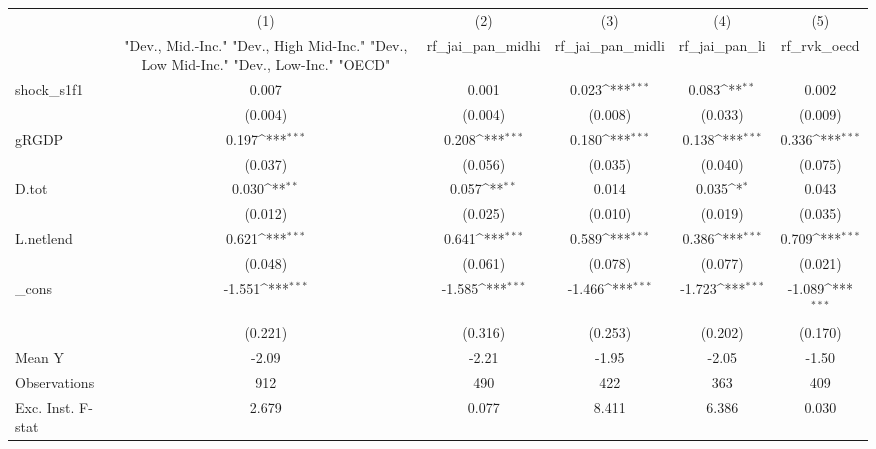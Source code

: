 {
\def\sym#1{\ifmmode^{#1}\else\(^{#1}\)\fi}
\begin{tabular}{l*{5}{c}}
\toprule
            &\multicolumn{1}{c}{(1)}&\multicolumn{1}{c}{(2)}&\multicolumn{1}{c}{(3)}&\multicolumn{1}{c}{(4)}&\multicolumn{1}{c}{(5)}\\
            &\multicolumn{1}{c}{ "Dev., Mid.-Inc." "Dev., High Mid-Inc." "Dev., Low Mid-Inc." "Dev., Low-Inc." "OECD" }&\multicolumn{1}{c}{rf\_jai\_pan\_midhi}&\multicolumn{1}{c}{rf\_jai\_pan\_midli}&\multicolumn{1}{c}{rf\_jai\_pan\_li}&\multicolumn{1}{c}{rf\_rvk\_oecd}\\
\midrule
shock\_s1f1  &       0.007         &       0.001         &       0.023\sym{***}&       0.083\sym{**} &       0.002         \\
            &     (0.004)         &     (0.004)         &     (0.008)         &     (0.033)         &     (0.009)         \\
\addlinespace
gRGDP       &       0.197\sym{***}&       0.208\sym{***}&       0.180\sym{***}&       0.138\sym{***}&       0.336\sym{***}\\
            &     (0.037)         &     (0.056)         &     (0.035)         &     (0.040)         &     (0.075)         \\
\addlinespace
D.tot       &       0.030\sym{**} &       0.057\sym{**} &       0.014         &       0.035\sym{*}  &       0.043         \\
            &     (0.012)         &     (0.025)         &     (0.010)         &     (0.019)         &     (0.035)         \\
\addlinespace
L.netlend   &       0.621\sym{***}&       0.641\sym{***}&       0.589\sym{***}&       0.386\sym{***}&       0.709\sym{***}\\
            &     (0.048)         &     (0.061)         &     (0.078)         &     (0.077)         &     (0.021)         \\
\addlinespace
\_cons      &      -1.551\sym{***}&      -1.585\sym{***}&      -1.466\sym{***}&      -1.723\sym{***}&      -1.089\sym{***}\\
            &     (0.221)         &     (0.316)         &     (0.253)         &     (0.202)         &     (0.170)         \\
\midrule
Mean Y      &       -2.09         &       -2.21         &       -1.95         &       -2.05         &       -1.50         \\
Observations&         912         &         490         &         422         &         363         &         409         \\
Exc. Inst. F-stat&       2.679         &       0.077         &       8.411         &       6.386         &       0.030         \\
\bottomrule
\end{tabular}
}
